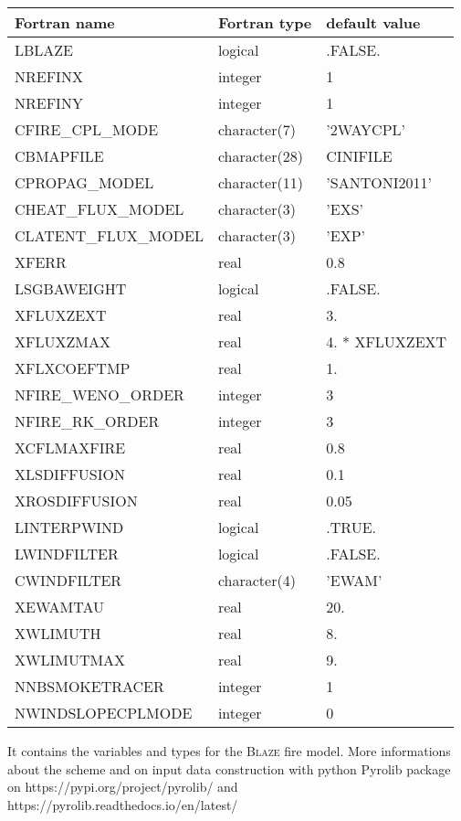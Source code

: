 \begin{center}
\begin{tabular} {|l|l|l|}
\hline
Fortran name & Fortran type & default value \\
\hline

LBLAZE          &  logical     & .FALSE. \\
NREFINX           &  integer      & 1 \\
NREFINY           &  integer      & 1 \\
CFIRE\_CPL\_MODE     &   character(7)  & '2WAYCPL' \\
CBMAPFILE         &   character(28)  & CINIFILE \\
CPROPAG\_MODEL      &  character(11)  & 'SANTONI2011' \\

CHEAT\_FLUX\_MODEL    &   character(3)  & 'EXS' \\
CLATENT\_FLUX\_MODEL  &   character(3)  & 'EXP' \\
XFERR          &  real      & 0.8 \\
LSGBAWEIGHT         &  logical     & .FALSE. \\
XFLUXZEXT        &  real      & 3. \\
XFLUXZMAX         &  real      & 4. * XFLUXZEXT \\
XFLXCOEFTMP        &  real      & 1. \\

NFIRE\_WENO\_ORDER     &  integer      & 3 \\
NFIRE\_RK\_ORDER     &   integer      & 3 \\
XCFLMAXFIRE         &   real      & 0.8 \\
XLSDIFFUSION       &  real      & 0.1 \\
XROSDIFFUSION       &  real      & 0.05 \\

LINTERPWIND         &   logical     & .TRUE. \\
LWINDFILTER         &   logical     & .FALSE. \\
CWINDFILTER        &  character(4)  & 'EWAM' \\
XEWAMTAU          &  real      & 20. \\
XWLIMUTH         &  real      & 8. \\
XWLIMUTMAX        &  real      & 9. \\

NNBSMOKETRACER      &  integer      & 1 \\
NWINDSLOPECPLMODE    &  integer      & 0 \\
\hline
\end{tabular}
\end{center}
It contains the variables and types for the \textsc{Blaze} fire model. More informations about the scheme and on input data construction with python Pyrolib package on https://pypi.org/project/pyrolib/ and https://pyrolib.readthedocs.io/en/latest/

